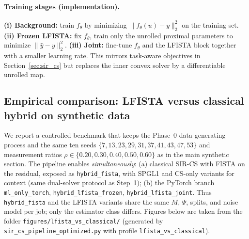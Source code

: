 \paragraph{Training stages (implementation).}
\textbf{(i) Background:} train $f_\theta$ by minimizing $\|f_\theta(u)-y\|_2^2$ on the training set.
\textbf{(ii) Frozen LFISTA:} fix $f_\theta$, train only the unrolled proximal parameters to minimize $\|\hat{y}-y\|_2^2$.
\textbf{(iii) Joint:} fine-tune $f_\theta$ and the LFISTA block together with a smaller learning rate.
This mirrors task-aware objectives in Section~\ref{sec:sir_cs} but replaces the inner convex solver by a differentiable unrolled map.



\subsection{Empirical comparison: LFISTA versus classical hybrid on synthetic data}
\label{subsec:lfista_exp}

We report a controlled benchmark that keeps the Phase~0 data-generating process and the same ten seeds
$\{7,13,23,29,31,37,41,43,47,53\}$ and measurement ratios $\rho\in\{0.20,0.30,0.40,0.50,0.60\}$ as in the main synthetic section.
The pipeline enables \emph{simultaneously}: (a) classical SIR-CS with FISTA on the residual, exposed as \texttt{hybrid\_fista}, with SPGL1 and CS-only variants for context (same dual-solver protocol as Step~1); (b) the PyTorch branch \texttt{ml\_only\_torch}, \texttt{hybrid\_lfista\_frozen}, \texttt{hybrid\_lfista\_joint}.
Thus \texttt{hybrid\_fista} and the LFISTA variants share the same $M$, $\Psi$, splits, and noise model per job; only the estimator class differs.
Figures below are taken from the folder \texttt{figures/lfista\_vs\_classical/} (generated by \texttt{sir\_cs\_pipeline\_optimized.py} with profile \texttt{lfista\_vs\_classical}).

